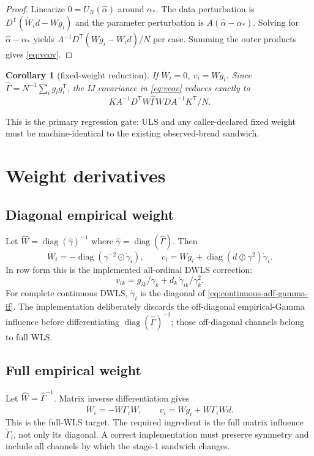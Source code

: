 \documentclass[11pt]{article}
\newcommand{\diag}{\operatorname{diag}}
\newcommand{\T}{^{\mathsf T}}
\theoremstyle{plain}
\newtheorem{corollary}{Corollary}
\theoremstyle{remark}
\begin{document}
\begin{proof}
Linearize $0=U_N(\hat\alpha)$ around $\alpha_*$. The data perturbation is
$D\T(\dot W_i d-Wg_i)$ and the parameter perturbation is
$A(\hat\alpha-\alpha_*)$. Solving for $\hat\alpha-\alpha_*$ yields
$A^{-1}D\T(Wg_i-\dot W_i d)/N$ per case. Summing the outer products gives
\eqref{eq:vcov}.
\end{proof}

\begin{corollary}[fixed-weight reduction]\label{cor:fixed}
If $\dot W_i=0$, $v_i=Wg_i$. Since
$\hat\Gamma=N^{-1}\sum_i g_i g_i\T$, the IJ covariance in \eqref{eq:vcov}
reduces exactly to
\[
  K A^{-1}D\T W\hat\Gamma W D A^{-1}K\T / N.
\]
\end{corollary}

This is the primary regression gate: ULS and any caller-declared fixed weight
must be machine-identical to the existing observed-bread sandwich.

\section{Weight derivatives}

\subsection{Diagonal empirical weight}

Let $\hat W=\diag(\hat\gamma)^{-1}$ where
$\hat\gamma=\diag(\hat\Gamma)$. Then
\[
  \dot W_i = -\diag(\gamma^{-2}\odot \dot\gamma_i),
  \qquad
  v_i = Wg_i + \diag(d\oslash \gamma^2)\dot\gamma_i .
\]
In row form this is the implemented all-ordinal DWLS correction:
\[
  v_{ik}=g_{ik}/\gamma_k + d_k\,\dot\gamma_{ik}/\gamma_k^2 .
\]
For complete continuous DWLS, $\dot\gamma_i$ is the diagonal of
\eqref{eq:continuous-adf-gamma-if}. The implementation deliberately discards
the off-diagonal empirical-Gamma influence before differentiating
$\diag(\hat\Gamma)^{-1}$; those off-diagonal channels belong to full WLS.

\subsection{Full empirical weight}

Let $\hat W=\hat\Gamma^{-1}$. Matrix inverse differentiation gives
\[
  \dot W_i=-W\dot\Gamma_i W,
  \qquad
  v_i = Wg_i + W\dot\Gamma_i Wd .
\]
This is the full-WLS target. The required ingredient is the full matrix influence
$\dot\Gamma_i$, not only its diagonal. A correct implementation must preserve
symmetry and include all channels by which the stage-1 sandwich changes.
\end{document}
